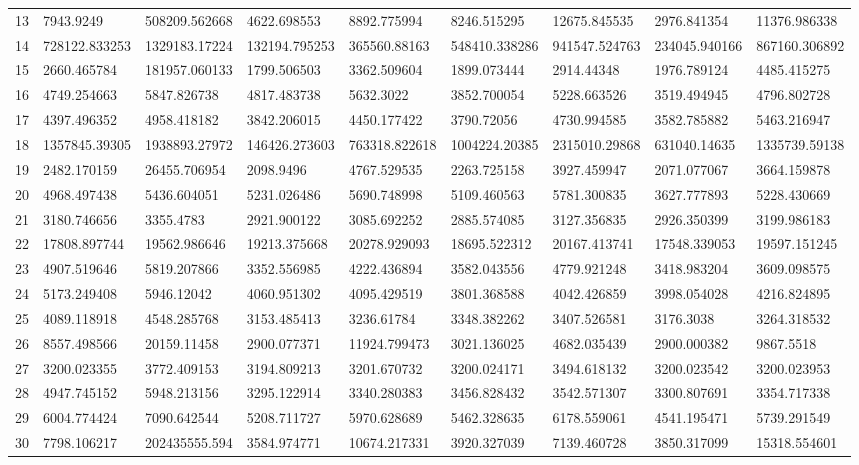 \begin{table*}[t]
\begin{tabular}{|p{0.8cm}|p{1.6cm}|p{1.6cm}|p{1.6cm}|p{1.6cm}|p{1.6cm}|p{1.6cm}|p{1.6cm}|p{1.6cm}|}
13  & 7943.9249 & 508209.562668 & 4622.698553 & 8892.775994 & 8246.515295 & 12675.845535 & 2976.841354 & 11376.986338 \\ 
14  & 728122.833253 & 1329183.17224 & 132194.795253 & 365560.88163 & 548410.338286 & 941547.524763 & 234045.940166 & 867160.306892 \\ 
15  & 2660.465784 & 181957.060133 & 1799.506503 & 3362.509604 & 1899.073444 & 2914.44348 & 1976.789124 & 4485.415275 \\ 
16  & 4749.254663 & 5847.826738 & 4817.483738 & 5632.3022 & 3852.700054 & 5228.663526 & 3519.494945 & 4796.802728 \\ 
17  & 4397.496352 & 4958.418182 & 3842.206015 & 4450.177422 & 3790.72056 & 4730.994585 & 3582.785882 & 5463.216947 \\ 
18  & 1357845.39305 & 1938893.27972 & 146426.273603 & 763318.822618 & 1004224.20385 & 2315010.29868 & 631040.14635 & 1335739.59138 \\ 
19  & 2482.170159 & 26455.706954 & 2098.9496 & 4767.529535 & 2263.725158 & 3927.459947 & 2071.077067 & 3664.159878 \\ 
20  & 4968.497438 & 5436.604051 & 5231.026486 & 5690.748998 & 5109.460563 & 5781.300835 & 3627.777893 & 5228.430669 \\ 
21  & 3180.746656 & 3355.4783 & 2921.900122 & 3085.692252 & 2885.574085 & 3127.356835 & 2926.350399 & 3199.986183 \\ 
22  & 17808.897744 & 19562.986646 & 19213.375668 & 20278.929093 & 18695.522312 & 20167.413741 & 17548.339053 & 19597.151245 \\ 
23  & 4907.519646 & 5819.207866 & 3352.556985 & 4222.436894 & 3582.043556 & 4779.921248 & 3418.983204 & 3609.098575 \\ 
24  & 5173.249408 & 5946.12042 & 4060.951302 & 4095.429519 & 3801.368588 & 4042.426859 & 3998.054028 & 4216.824895 \\ 
25  & 4089.118918 & 4548.285768 & 3153.485413 & 3236.61784 & 3348.382262 & 3407.526581 & 3176.3038 & 3264.318532 \\ 
26  & 8557.498566 & 20159.11458 & 2900.077371 & 11924.799473 & 3021.136025 & 4682.035439 & 2900.000382 & 9867.5518 \\ 
27  & 3200.023355 & 3772.409153 & 3194.809213 & 3201.670732 & 3200.024171 & 3494.618132 & 3200.023542 & 3200.023953 \\ 
28  & 4947.745152 & 5948.213156 & 3295.122914 & 3340.280383 & 3456.828432 & 3542.571307 & 3300.807691 & 3354.717338 \\ 
29  & 6004.774424 & 7090.642544 & 5208.711727 & 5970.628689 & 5462.328635 & 6178.559061 & 4541.195471 & 5739.291549 \\ 
30  & 7798.106217 & 202435555.594 & 3584.974771 & 10674.217331 & 3920.327039 & 7139.460728 & 3850.317099 & 15318.554601 \\ 
\hline


 \end{tabular}
\end{table*}
\endgroup
